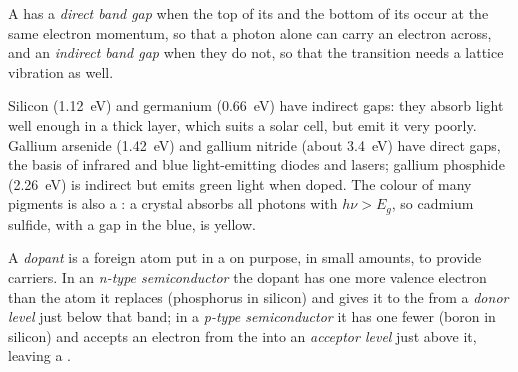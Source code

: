 \begin{definition}\label{def:b3:solid-state:gap-types}
A  has a \emph{direct band gap} when the
top of its  and the bottom of its  occur at the same
electron momentum, so that a photon alone can carry an electron across, and an
\emph{indirect band gap} when they do not, so that the
transition needs a lattice vibration as well.
\end{definition}

Silicon (\qty{1.12}{eV}) and germanium (\qty{0.66}{eV}) have indirect gaps:
they absorb light well enough in a thick layer, which suits a solar cell, but
emit it very poorly. Gallium arsenide (\qty{1.42}{eV}) and gallium nitride (about
\qty{3.4}{eV}) have direct gaps, the basis of infrared and blue light-emitting
diodes and lasers; gallium phosphide (\qty{2.26}{eV}) is indirect but emits green
light when doped. The colour of many pigments is also a : a crystal
absorbs all photons with $h\nu > E_g$, so cadmium sulfide, with a gap in the blue,
is yellow.

\begin{definition}[Doping]\label{def:b3:solid-state:doping}
A \emph{dopant} is a foreign atom put in a  on
purpose, in small amounts, to provide carriers. In an \emph{n-type
semiconductor} the dopant has one more valence
electron than the atom it replaces (phosphorus in silicon) and gives it to the
 from a \emph{donor level} just below that
band; in a \emph{p-type semiconductor} it has one
fewer (boron in silicon) and accepts an electron from the  into an
\emph{acceptor level} just above it, leaving a .
\end{definition}

